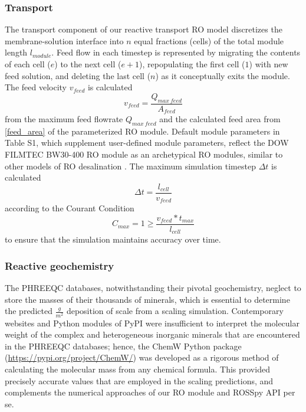 \documentclass[journal=ACSES&TWater,manuscript=article]{achemso}
\begin{document}
\subsubsection{Transport}
The transport component of our reactive transport RO model discretizes the membrane-solution interface into $n$ equal fractions (cells) of the total module length $l_{module}$. Feed flow in each timestep is represented by migrating the contents of each cell ($e$) to the next cell ($e+1$), repopulating the first cell ($1$) with new feed solution, and deleting the last cell ($n$) as it conceptually exits the module. The feed velocity $v_{feed}$ is calculated
\begin{equation} \label{feed_velocity}
    v_{feed}=\frac{Q_{max~feed}}{A_{feed}}
\end{equation}
from the maximum feed flowrate $Q_{max~feed}$ and the calculated feed area from \cref{feed_area} of the parameterized RO module. Default module parameters in Table S1, which supplement user-defined module parameters, reflect the DOW FILMTEC BW30-400 RO module as an archetypical RO modules, similar to other models of RO desalination \cite{Li2012OptimalDesalination}. The maximum simulation timestep $\Delta t$ is calculated
\begin{equation} \label{timestep}
    \Delta t=\frac{l_{cell}}{v_{feed}}
\end{equation}
according to the Courant Condition \cite{Gnedin2018EnforcingSchemes} 
\begin{equation} \label{courant_condition}
    C_{max}=1 \ge \frac{v_{feed}*t_{max}}{l_{cell}}
\end{equation}
to ensure that the simulation maintains accuracy over time.


\subsubsection{Reactive geochemistry}
The PHREEQC databases, notwithstanding their pivotal geochemistry, neglect to store the masses of their thousands of minerals, which is essential to determine the predicted $\frac{g}{m^2}$ deposition of scale from a scaling simulation. Contemporary websites and Python modules of PyPI were insufficient to interpret the molecular weight of the complex and heterogeneous inorganic minerals that are encountered in the PHREEQC databases; hence, the ChemW Python package (\url{https://pypi.org/project/ChemW/}) was developed as a rigorous method of calculating the molecular mass from any chemical formula. This provided precisely accurate values that are employed in the scaling predictions, and complements the numerical approaches of our RO module and ROSSpy API per se. 
\end{document}
